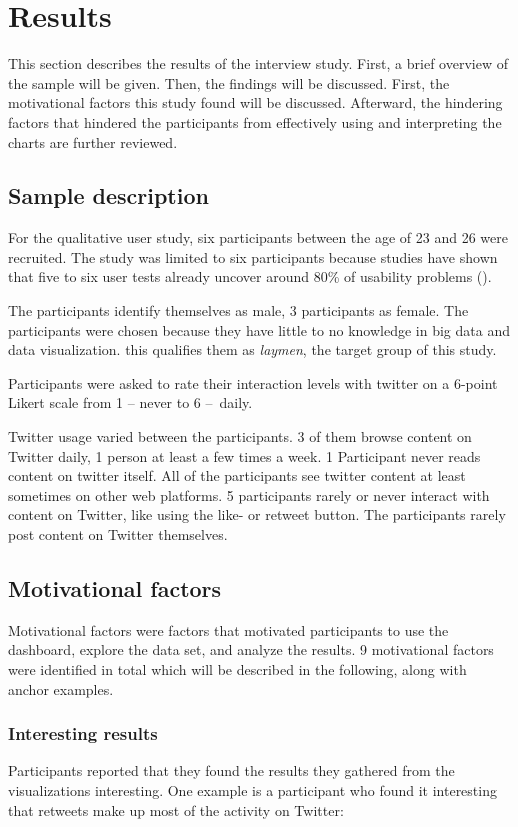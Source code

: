 \section{Results}
This section describes the results of the interview study. First, a brief overview of the sample will be given. Then, the findings will be discussed. First, the motivational factors this study found will be discussed. Afterward, the hindering factors that hindered the participants from effectively using and interpreting the charts are further reviewed.

\subsection{Sample description}
For the qualitative user study, six participants between the age of 23 and 26 were recruited. The study was limited to six participants because studies have shown that five to six user tests already uncover around 80\% of usability problems (\cite{10.1145/169059.169166}).

The participants identify themselves as male, 3 participants as female. The participants were chosen because they have little to no knowledge in big data and data visualization. this qualifies them as \emph{laymen}, the target group of this study.

Participants were asked to rate their interaction levels with twitter on a 6-point Likert scale from 1 – never to 6 – daily.

Twitter usage varied between the participants. 3 of them browse content on Twitter daily, 1 person at least a few times a week. 1 Participant never reads content on twitter itself. All of the participants see twitter content at least sometimes on other web platforms. 5 participants rarely or never interact with content on Twitter, like using the like- or retweet button. The participants rarely post content on Twitter themselves.

\subsection{Motivational factors}
Motivational factors were factors that motivated participants to use the dashboard, explore the data set, and analyze the results. 9 motivational factors were identified in total which will be described in the following, along with anchor examples.

\subsubsection*{Interesting results}
Participants reported that they found the results they gathered from the visualizations interesting. One example is a participant who found it interesting that retweets make up most of the activity on Twitter:

